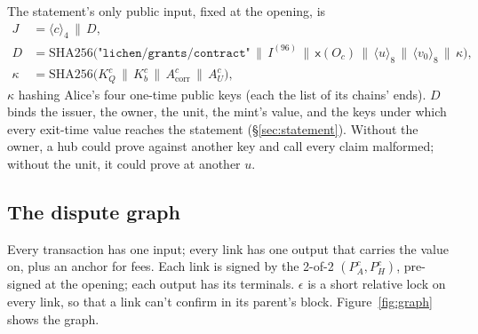 \documentclass[11pt]{article}
\theoremstyle{plain}
\theoremstyle{definition}
\newcommand{\be}[2]{\langle #1\rangle_{#2}}
\newcommand{\xo}[1]{\mathsf{x}(#1)}
\newcommand{\PH}{P_H^{c}}
\newcommand{\Oc}{O_c}
\newcommand{\KQ}{K_{Q}^{c}}
\newcommand{\Kb}{K_{b}^{c}}
\newcommand{\Acorr}{A_{\mathrm{corr}}^{c}}
\newcommand{\AU}{A_{U}^{c}}
\begin{document}
The statement's only public input, fixed at the opening, is
\begin{align*}
  J &= \be{c}{4} \,\|\, D,\\
  D &= \mathrm{SHA256}\big(\texttt{"lichen/grants/contract"} \,\|\,
  I^{(96)} \,\|\, \xo{\Oc} \,\|\, \be{u}{8} \,\|\, \be{v_0}{8} \,\|\, \kappa\big),\\
  \kappa &= \mathrm{SHA256}\big(\KQ \,\|\, \Kb \,\|\, \Acorr \,\|\, \AU\big),
\end{align*}
$\kappa$ hashing Alice's four one-time public keys (each the list of its
chains' ends). $D$ binds the issuer, the owner, the unit, the mint's
value, and the keys under which every exit-time value reaches the
statement (\S\ref{sec:statement}). Without the owner, a hub could prove
against another key and call every claim malformed; without the unit,
it could prove at another $u$.

\subsection{The dispute graph}\label{sec:graph}

Every transaction has one input; every link has one output that carries
the value on, plus an anchor for fees. Each link is signed by the 2-of-2
$(P_A^c, \PH)$, pre-signed at the opening; each output has its
terminals. $\epsilon$ is a short relative lock on every link, so that a
link can't confirm in its parent's block. Figure~\ref{fig:graph} shows
the graph.
\end{document}
